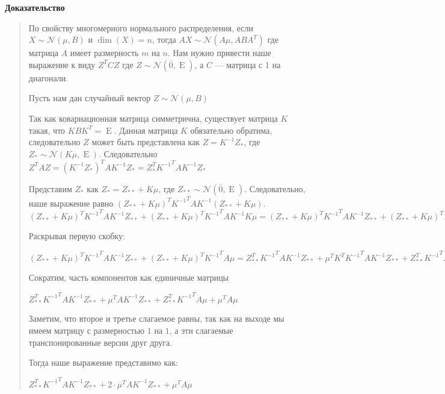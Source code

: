 \documentclass{article}
\begin{document}
    \quad

    \textbf{Доказательство}

    \quad

    \begin{quote}
        По свойству многомерного нормального распределения,
        если $X \sim \mathcal{N}(\mu, B)$ и $\dim(X) = n$,
        тогда $AX \sim \mathcal{N}(A \mu, A B A^{T})$ где матрица $A$ имеет размерность $m$ на $n$.
        Нам нужно привести наше выражение к виду $Z^{T} C Z$ где $Z \sim \mathcal{N}(\bar{0}, \operatorname{E}) $,
        а $C$ --- матрица с 1 на диагонали.

        Пусть нам дан случайный вектор $Z \sim \mathcal{N}(\mu, B)$

        Так как ковариационная матрица симметрична, существует матрица $K$ такая, что $K B K^{T} = \operatorname{E}$.
        Данная матрица $K$ обязательно обратима, следовательно $Z$ может быть представлена как $Z = K^{-1} Z_{*}$, где
        $Z_{*} \sim \mathcal{N}(K \mu , \operatorname{E})$.
        Следовательно $Z^{T} A Z = (K^{-1} Z_{*})^{T} A K^{-1} Z_{*} = Z_{*}^{T} {K^{-1}}^{T}A K^{-1} Z_{*}$

        Представим $Z_{*}$ как $Z_{*} = Z_{**} + K \mu$, где $Z_{**} \sim \mathcal{N}(\bar{0} , \operatorname{E})$.
        Следовательно, наше выражение равно $(Z_{**} + K \mu)^{T} {K^{-1}}^{T}A K^{-1} (Z_{**} + K \mu)$.
        $(Z_{**} + K \mu)^{T} {K^{-1}}^{T}A K^{-1} Z_{**} + (Z_{**} + K \mu)^{T} {K^{-1}}^{T}A K^{-1} K \mu =
        (Z_{**} + K \mu)^{T} {K^{-1}}^{T}A K^{-1} Z_{**} + (Z_{**} + K \mu)^{T} {K^{-1}}^{T}A \mu$

        Раскрывая первую скобку:

        $(Z_{**} + K \mu)^{T} {K^{-1}}^{T}A K^{-1} Z_{**} + (Z_{**} + K \mu)^{T} {K^{-1}}^{T}A \mu =
        Z_{**}^{T} {K^{-1}}^{T}A K^{-1} Z_{**} + \mu^{T} K^{T} {K^{-1}}^{T}A K^{-1} Z_{**} +
        Z_{**}^{T} {K^{-1}}^{T}A \mu   + \mu^{T} K^{T} {K^{-1}}^{T} A \mu$

        Сократим, часть компонентов как единичные матрицы

        $Z_{**}^{T} {K^{-1}}^{T}A K^{-1} Z_{**} + \mu^{T} A K^{-1} Z_{**} +
        Z_{**}^{T} {K^{-1}}^{T}A \mu  + \mu^{T} A \mu$

        Заметим, что второе и третье слагаемое равны, так как на выходе мы имеем матрицу с размерностью $1$ на $1$, а эти слагаемые транспонированные версии друг друга.

        Тогда наше выражение представимо как:

        $Z_{**}^{T} {K^{-1}}^{T}A K^{-1} Z_{**} + 2 \cdot \mu^{T} A K^{-1} Z_{**} + \mu^{T} A \mu$





    \end{quote}
\end{document}
